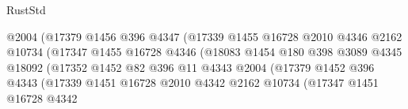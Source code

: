 \begin{lexlean}{RustStd}
\begin{coremodule}
                                            @2004
                                            (@17379
                                              @1456
                                              @396
                                              @4347
                                              (@17339
                                                @1455
                                                @16728
                                                @2010
                                                @4346
                                                @2162
                                                @10734
                                                (@17347
                                                  @1455
                                                  @16728
                                                  @4346
                                                  (@18083
                                                    @1454
                                                    @180
                                                    @398
                                                    @3089
                                                    @4345
                                                    @18092
                                                    (@17352
                                                      @1452
                                                      @82
                                                      @396
                                                      @11
                                                      @4343
                                                      @2004
                                                      (@17379
                                                        @1452
                                                        @396
                                                        @4343
                                                        (@17339
                                                          @1451
                                                          @16728
                                                          @2010
                                                          @4342
                                                          @2162
                                                          @10734
                                                          (@17347
                                                            @1451
                                                            @16728
                                                            @4342

\end{coremodule}
\end{lexlean}
